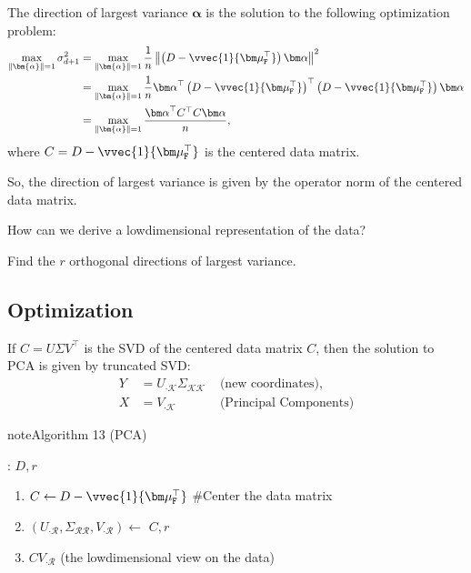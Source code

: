 \documentclass[letterpaper,10pt,english]{jupyterBook}
\begin{document}
\sphinxAtStartPar
The direction of largest variance \({\bm\alpha}\) is the solution to the following optimization problem:
\label{equation:dim_reduction_pca:f69f9f25-9785-449f-95a1-028252edd2ff}\begin{align}
    \max_{\lVert \bm{\alpha}\rVert=1}\sigma_{d+1}^2
&=\max_{\lVert \bm{\alpha}\rVert=1}
\frac1n\left\lVert \left(D-\vvec{1}{\bm\mu_\mathtt{F}^\top}\right){\bm\alpha}\right\rVert^2 \\
&= \max_{\lVert \bm{\alpha}\rVert=1} \frac1n {\bm\alpha}^\top \left(D-\vvec{1}{\bm\mu_\mathtt{F}^\top}\right)^\top \left(D-\vvec{1}{\bm\mu_\mathtt{F}^\top}\right){\bm\alpha}\\
&=\max_{\lVert \bm{\alpha}\rVert=1} \frac{{\bm\alpha}^\top C^\top C{\bm\alpha}}{n},
\end{align}
\sphinxAtStartPar
where \(C=D-\vvec{1}{\bm\mu_\mathtt{F}^\top}\) is the centered data matrix.

\sphinxAtStartPar
So, the direction of largest variance is given by the operator norm of the centered data matrix.

\sphinxAtStartPar
How can we derive a low\sphinxhyphen{}dimensional representation of the data?

\sphinxAtStartPar
Find the \(r\) orthogonal directions of largest variance.


\subsection{Optimization}
\label{\detokenize{dim_reduction_pca:optimization}}
\sphinxAtStartPar
If \(C=U\Sigma V^\top\) is the SVD of the centered data matrix \(C\), then the solution to PCA is given by truncated SVD:
\label{equation:dim_reduction_pca:bf8731c5-d931-43a3-944b-dc0dcc5730ec}\begin{align}
    Y &= U_{\cdot \mathcal{K}}\Sigma_{\mathcal{K}\mathcal{K}} &\text{ (new coordinates)},\\ 
    X& =V_{\cdot \mathcal{K}} &\text{ (Principal Components)}
\end{align}\label{dim_reduction_pca:algorithm-0}
\begin{sphinxadmonition}{note}{Algorithm 13 (PCA)}



\sphinxAtStartPar
{}: \(D, r\)
\begin{enumerate}
%
\item {} 
\sphinxAtStartPar
\(C\gets D-\vvec{1}{\bm\mu_\mathtt{F}^\top}\)  \#Center the data matrix

\item {} 
\sphinxAtStartPar
\((U_{\cdot \mathcal{R}},\Sigma_{\mathcal{R} \mathcal{R}},V_{\cdot \mathcal{R}})\gets\) \({C,r}\)

\item {} 
\sphinxAtStartPar
{} \(CV_{\cdot \mathcal{R}}\) (the low\sphinxhyphen{}dimensional view on the data)

\end{enumerate}
\end{sphinxadmonition}
\end{document}
